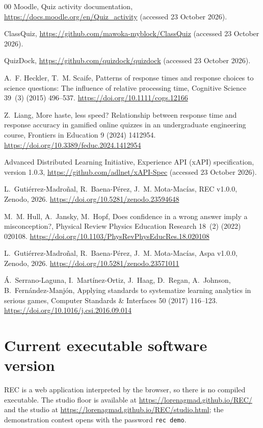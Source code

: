 \documentclass[preprint,12pt, a4paper]{elsarticle}
\begin{document}
\begin{thebibliography}{00}
 Moodle, Quiz activity documentation, \url{https://docs.moodle.org/en/Quiz_activity} (accessed 23 October 2026).

 ClassQuiz, \url{https://github.com/mawoka-myblock/ClassQuiz} (accessed 23 October 2026).

 QuizDock, \url{https://github.com/quizdock/quizdock} (accessed 23 October 2026).

 A.~F. Heckler, T.~M. Scaife, Patterns of response times and response choices to science questions: The influence of relative processing time, Cognitive Science 39~(3) (2015) 496--537. \url{https://doi.org/10.1111/cogs.12166}

 Z.~Liang, More haste, less speed? Relationship between response time and response accuracy in gamified online quizzes in an undergraduate engineering course, Frontiers in Education 9 (2024) 1412954. \url{https://doi.org/10.3389/feduc.2024.1412954}

 Advanced Distributed Learning Initiative, Experience API (xAPI) specification, version 1.0.3, \url{https://github.com/adlnet/xAPI-Spec} (accessed 23 October 2026).

 L.~Gutiérrez-Madroñal, R.~Baena-Pérez, J.~M. Mota-Macías, REC v1.0.0, Zenodo, 2026. \url{https://doi.org/10.5281/zenodo.23594648}

 M.~M. Hull, A.~Jansky, M.~Hopf, Does confidence in a wrong answer imply a misconception?, Physical Review Physics Education Research 18~(2) (2022) 020108. \url{https://doi.org/10.1103/PhysRevPhysEducRes.18.020108}

 L.~Gutiérrez-Madroñal, R.~Baena-Pérez, J.~M. Mota-Macías, Aspa v1.0.0, Zenodo, 2026. \url{https://doi.org/10.5281/zenodo.23571011}

 Á.~Serrano-Laguna, I.~Martínez-Ortiz, J.~Haag, D.~Regan, A.~Johnson, B.~Fernández-Manjón, Applying standards to systematize learning analytics in serious games, Computer Standards \& Interfaces 50 (2017) 116--123. \url{https://doi.org/10.1016/j.csi.2016.09.014}

\end{thebibliography}

\section*{Current executable software version}
\label{sec:execversion}

REC is a web application interpreted by the browser, so there is no compiled executable. The studio floor is available at \url{https://lorenagmad.github.io/REC/} and the studio at \url{https://lorenagmad.github.io/REC/studio.html}; the demonstration contest opens with the password \texttt{rec demo}.
\end{document}
